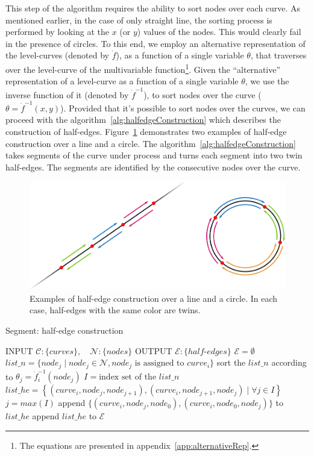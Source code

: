 This step of the algorithm requires the ability to sort nodes over each curve.
As mentioned earlier, in the case of only straight line, the sorting process is performed by looking at the $x$ (or $y$) values of the nodes.
This would clearly fail in the presence of circles.
To this end, we employ an alternative representation of the level-curves (denoted by $\dot{f}$), as a function of a single variable $\theta$, that traverses over the level-curve of the multivariable function\footnote{The equations are presented in appendix~\ref{app:alternativeRep}.}.
Given the ``alternative'' representation of a level-curve as a function of a single variable $\theta$, we use the inverse function of it (denoted by $\dot{f}^{-1}$), to sort nodes over the curve ($\theta = \dot{f}^{-1}(x,y)$).
Provided that it's possible to sort nodes over the curves, we can proceed with the algorithm~\ref{alg:halfedgeConstruction} which describes the construction of half-edges.
Figure~\ref{fig:subd_heConstruct} demonstrates two examples of half-edge construction over a line and a circle.
The algorithm~\ref{alg:halfedgeConstruction} takes segments of the curve under process and turns each segment into two twin half-edges.
The segments are identified by the consecutive nodes over the curve.

\begin{figure}
    \centering
    \includegraphics[width=.8\textwidth]{figures/subd_heConstruct.png}
    \caption{Examples of half-edge construction over a line and a circle.
      In each case, half-edges with the same color are twins.}
    \label{fig:subd_heConstruct}
\end{figure}

\begin{algorithm}
  \caption {Segment: half-edge construction}
  \label{alg:halfedgeConstruction}
  \begin{algorithmic}
    \STATE INPUT  $\mathcal{C}:\{curves\}, \quad \mathcal{N}:\{nodes\}$
    \STATE OUTPUT  $\mathcal{E}:\{half\text{-}edges\}$
    \STATE \quad
    \STATE $\mathcal{E} = \emptyset$
    \STATE $list\_n = \{node_j \mid node_j \in \mathcal{N}, node_j \text{ is assigned to } curve_i \}$
    \STATE sort the $list\_n$ according to $\theta_j=\dot{f}_{i}^{-1}(node_j)$
    \STATE $I= \text{index set of the } list\_n$
    \STATE $list\_he=\left\{(curve_i,node_j,node_{j+1}),(curve_i,node_{j+1},node_j) \mid \forall j \in I \right\}$
    \STATE $j=max(I)$
    \STATE append $\{(curve_i,node_j,node_{0}),(curve_i,node_0,node_{j})\}$ to $list\_he$
    \ENDIF
    \STATE append $list\_he$ to $\mathcal{E}$
    \ENDFOR    
  \end{algorithmic}
\end{algorithm}


